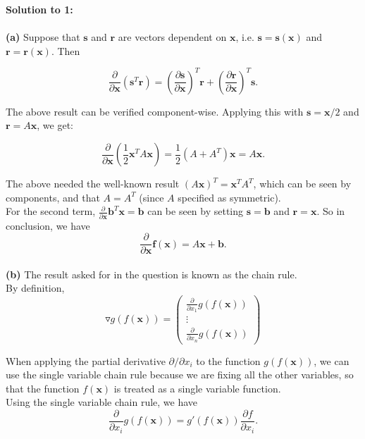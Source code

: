 \documentclass{article}
\begin{document}
\textbf{Solution to 1:}
\\
\\ 
\textbf{(a)} Suppose that $\mathbf{s}$ and $\mathbf{r}$ are vectors dependent on $\mathbf{x}$, 
i.e. $\mathbf{s} = \mathbf{s}(\mathbf{x})$ and $\mathbf{r} = \mathbf{r}(\mathbf{x})$. 
Then 

$$\frac{\partial}{\partial \mathbf{x}} (\mathbf{s}^T \mathbf{r}) = 
\left(\frac{\partial \mathbf{s}}{\partial \mathbf{x}}\right)^T \mathbf{r} + 
\left(\frac{\partial \mathbf{r}}{\partial \mathbf{x}}\right)^T \mathbf{s}.$$

The above result can be verified component-wise.
Applying this with $\mathbf{s} = \mathbf{x} / 2$ and
$\mathbf{r} = A\mathbf{x}$, we get:

$$\frac{\partial}{\partial \mathbf{x}}\left(\frac{1}{2} \mathbf{x}^T A \mathbf{x}\right)
= \frac{1}{2}(A + A^T) \mathbf{x} = A \mathbf{x}.$$

The above needed the well-known result $(A \mathbf{x})^T = \mathbf{x}^T A^T$, which can be seen by 
components, and that $A = A^T$ (since $A$ specified as symmetric).\\

For the second term, $\frac{\partial}{\partial \mathbf{x}} \mathbf{b}^T\mathbf{x} = \mathbf{b}$ can be
seen by setting $\mathbf{s} = \mathbf{b}$ and $\mathbf{r} = \mathbf{x}.$ So in conclusion, 
we have $$\frac{\partial}{\partial \mathbf{x}} \mathbf{f}(\mathbf{x}) 
= A\mathbf{x} + \mathbf{b}.$$ \\

\textbf{(b)} The result asked for in the question is known as the chain rule.\\

By definition, $$\triangledown g(f(\mathbf{x})) = 
\begin{pmatrix}
  \frac{\partial}{\partial x_1} g(f(\mathbf{x}))\\
  \vdots\\
  \frac{\partial}{\partial x_n} g(f(\mathbf{x}))
\end{pmatrix}$$

When applying the partial derivative $\partial / \partial x_i$ to the function $g(f(\mathbf{x}))$,
we can use the single variable chain rule because we are fixing all the other variables, so that
the function $f(\mathbf{x})$ is treated as a single variable function.\\

Using the single variable chain rule, we have $$\frac{\partial}{\partial x_i} g(f(\mathbf{x})) = 
g'(f(\mathbf{x})) \frac{\partial f}{\partial x_i}.$$
\end{document}
